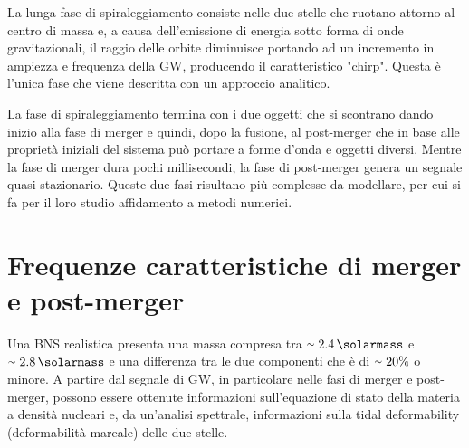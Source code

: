 La lunga fase di spiraleggiamento consiste nelle due stelle che ruotano attorno al centro di massa e, a causa dell'emissione di energia sotto forma di onde gravitazionali, il raggio delle orbite diminuisce portando ad un incremento in ampiezza e frequenza della GW, producendo il caratteristico "chirp". Questa è l'unica fase che viene descritta con un approccio analitico.

La fase di spiraleggiamento termina con i due oggetti che si scontrano dando inizio alla fase di merger e quindi, dopo la fusione, al post-merger che in base alle proprietà iniziali del sistema può portare a forme d'onda e oggetti diversi.	Mentre la fase di merger dura pochi millisecondi, la fase di post-merger genera un segnale quasi-stazionario. Queste due fasi risultano più complesse da modellare, per cui si fa per il loro studio affidamento a metodi numerici. \cite{maggiore2008gravitational}

\section[Frequenze caratteristiche]{Frequenze caratteristiche di merger e post-merger}
Una BNS realistica presenta una massa compresa tra $\smallsim\SI{2.4}{\solarmass}$ e $\smallsim\SI{2.8}{\solarmass}$ e una differenza tra le due componenti che è di $\smallsim20\%$ o minore. 
A partire dal segnale di GW, in particolare nelle fasi di merger e post-merger, possono essere ottenute informazioni sull'equazione di stato della materia a densità nucleari e, da un'analisi spettrale, informazioni sulla tidal deformability (deformabilità mareale) delle due stelle.

